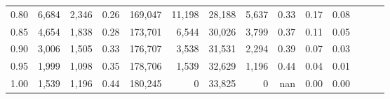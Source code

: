 \begin{tabular}{rrrrrrrrrrrrrr}
0.80 &   6,684 &  2,346 &  0.26 &  169,047 &   11,198 &  28,188 &   5,637 &  0.33 &  0.17 &      0.08 \\
0.85 &   4,654 &  1,838 &  0.28 &  173,701 &    6,544 &  30,026 &   3,799 &  0.37 &  0.11 &      0.05 \\
0.90 &   3,006 &  1,505 &  0.33 &  176,707 &    3,538 &  31,531 &   2,294 &  0.39 &  0.07 &      0.03 \\
0.95 &   1,999 &  1,098 &  0.35 &  178,706 &    1,539 &  32,629 &   1,196 &  0.44 &  0.04 &      0.01 \\
1.00 &   1,539 &  1,196 &  0.44 &  180,245 &        0 &  33,825 &       0 &   nan &  0.00 &      0.00 \\
\bottomrule
\end{tabular}
